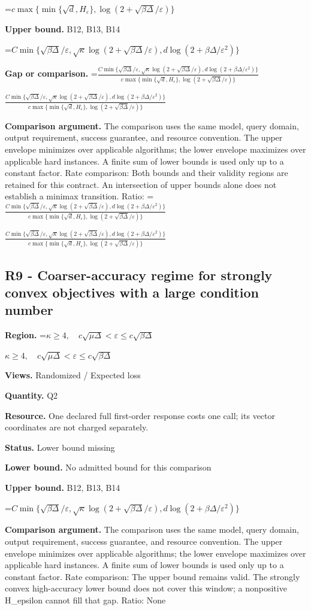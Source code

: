 \documentclass[10pt,a4paper]{article}
\newcommand{\AtlasMath}[1]{\par\begingroup\centering\setbox0=\hbox{$\displaystyle #1$}\ifdim\wd0>1.4\linewidth\typeout{ATLAS WIDE FORMULA: \the\wd0}\fi\ifdim\wd0>\linewidth\resizebox{\linewidth}{!}{\box0}\else\box0\fi\par\endgroup}
\newcommand{\AtlasInlineMath}[1]{\begingroup\setbox0=\hbox{$#1$}\ifdim\wd0>.4\linewidth\endgroup\AtlasMath{#1}\else\endgroup$#1$\fi}
\begin{document}
\AtlasMath{c\max\{\min\{\sqrt d,H_\varepsilon\},\log(2+\sqrt{\beta\Delta}/\varepsilon)\}}
\textbf{Upper bound.} B12, B13, B14

\AtlasMath{C\min\{\sqrt{\beta\Delta}/\varepsilon,\sqrt\kappa\log(2+\sqrt{\beta\Delta}/\varepsilon),d\log(2+\beta\Delta/\varepsilon^2)\}}
\textbf{Gap or comparison.} \AtlasInlineMath{\frac{C\min\{\sqrt{\beta\Delta}/\varepsilon,\sqrt\kappa\log(2+\sqrt{\beta\Delta}/\varepsilon),d\log(2+\beta\Delta/\varepsilon^2)\}}{c\max\{\min\{\sqrt d,H_\varepsilon\},\log(2+\sqrt{\beta\Delta}/\varepsilon)\}}}

\textbf{Comparison argument.} The comparison uses the same model, query domain, output requirement, success guarantee, and resource convention. The upper envelope minimizes over applicable algorithms; the lower envelope maximizes over applicable hard instances. A finite sum of lower bounds is used only up to a constant factor. Rate comparison: Both bounds and their validity regions are retained for this contract. An intersection of upper bounds alone does not establish a minimax transition. Ratio: \AtlasInlineMath{\frac{C\min\{\sqrt{\beta\Delta}/\varepsilon,\sqrt\kappa\log(2+\sqrt{\beta\Delta}/\varepsilon),d\log(2+\beta\Delta/\varepsilon^2)\}}{c\max\{\min\{\sqrt d,H_\varepsilon\},\log(2+\sqrt{\beta\Delta}/\varepsilon)\}}}

\subsection{R9 - Coarser-accuracy regime for strongly convex objectives with a large condition number}
\textbf{Region.} \AtlasInlineMath{\kappa\ge4,\quad c\sqrt{\mu\Delta}<\varepsilon\le c\sqrt{\beta\Delta}}

\textbf{Views.} Randomized / Expected loss

\textbf{Quantity.} Q2

\textbf{Resource.} One declared full first-order response costs one call; its vector coordinates are not charged separately.

\textbf{Status.} Lower bound missing

\textbf{Lower bound.} No admitted bound for this comparison

\textbf{Upper bound.} B12, B13, B14

\AtlasMath{C\min\{\sqrt{\beta\Delta}/\varepsilon,\sqrt\kappa\log(2+\sqrt{\beta\Delta}/\varepsilon),d\log(2+\beta\Delta/\varepsilon^2)\}}
\textbf{Comparison argument.} The comparison uses the same model, query domain, output requirement, success guarantee, and resource convention. The upper envelope minimizes over applicable algorithms; the lower envelope maximizes over applicable hard instances. A finite sum of lower bounds is used only up to a constant factor. Rate comparison: The upper bound remains valid. The strongly convex high-accuracy lower bound does not cover this window; a nonpositive H\_epsilon cannot fill that gap. Ratio: None
\end{document}
